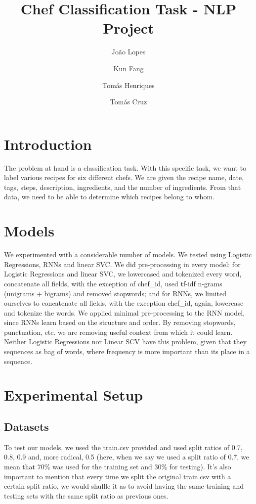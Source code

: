 \documentclass[twocolumn,10pt]{article}
\title{Chef Classification Task - NLP Project}
\author{João Lopes}
\author{Kun Fang}
\author{Tomás Henriques}
\author{Tomás Cruz}
\affil{Group 64\\ Instituto Superior Técnico, Universidade de Lisboa}
\begin{document}
\maketitle

\section{Introduction}
The problem at hand is a classification task. With this specific task, we want to label various recipes for six different chefs. We are given the recipe name, date, tags, steps, description, ingredients, and the number of ingredients. From that data, we need to be able to determine which recipes belong to whom.


\section{Models}
We experimented with a considerable number of models. We tested using Logistic Regressions, RNNs and linear SVC. We did pre-processing in every model: for Logistic Regressions and linear SVC, we lowercased and tokenized every word, concatenate all fields, with the exception of chef\_id, used tf-idf n-grams (unigrams + bigrams) and removed stopwords; and for RNNs, we limited ourselves to concatenate all fields, with the exception chef\_id, again, lowercase and tokenize the words. We applied minimal pre-processing to the RNN model, since RNNs learn based on the structure and order. By removing stopwords, punctuation, etc. we are removing useful context from which it could learn. Neither Logistic Regressions nor Linear SCV have this problem, given that they sequences as bag of words, where frequency is more important than its place in a sequence.


\section{Experimental Setup}
 
\subsection{Datasets}
To test our models, we used the train.csv provided and used split ratios of 0.7, 0.8, 0.9 and, more radical, 0.5 (here, when we say we used a split ratio of 0.7, we mean that 70\% was used for the training set and 30\% for testing). It's also important to mention that every time we split the original train.csv with a certain split ratio, we would shuffle it as to avoid having the same training and testing sets with the same split ratio as previous ones.
\end{document}
